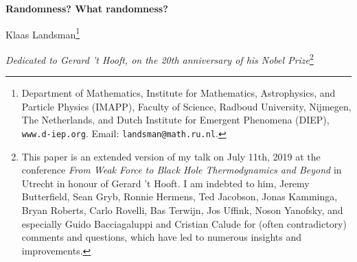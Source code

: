\documentclass[11pt,a4paper]{article}
\numberwithin{equation}{section}
\begin{document}
 
 \setlength{\unitlength}{1cm}\cleardoublepage
\date\nodate
\begin{center}
\begin{huge}
{\bf Randomness? What randomness?}
\end{huge}
\bigskip

\bigskip

\renewcommand{\thefootnote}{\alph{footnote}}
\begin{Large}
 Klaas Landsman\footnote{Department of Mathematics, 
Institute for Mathematics, Astrophysics, and Particle Physics (IMAPP), Faculty of Science, Radboud University, Nijmegen, The Netherlands, and Dutch Institute for Emergent Phenomena (DIEP), \texttt{www.d-iep.org}.
Email:
\texttt{landsman@math.ru.nl}.}
\end{Large}
\bigskip


\begin{large}
\emph{Dedicated to Gerard 't Hooft, on the 20th anniversary of his Nobel Prize}\footnote{This paper is an extended version of my talk on July 11th, 2019 at the conference \emph{From Weak Force to Black Hole Thermodynamics and Beyond} in Utrecht in honour of Gerard 't Hooft. I am indebted to him,  Jeremy Butterfield,  Sean Gryb, Ronnie Hermens, Ted Jacobson, Jonas Kamminga, Bryan Roberts, Carlo Rovelli, Bas Terwijn,  Jos Uffink,  Noson Yanofsky, and especially Guido Bacciagaluppi and Cristian Calude for (often contradictory) comments and questions, which have led to numerous  insights and improvements.  }
\end{large}
\end{center}
\bigskip

 \begin{abstract} 
\noindent 
This is a review of the issue of randomness in quantum mechanics, with special emphasis on its ambiguity; for example, randomness has different antipodal relationships to  determinism, computability, and compressibility. Following a (Wittgensteinian) philosophical discussion of randomness in general, I 
 argue that deterministic interpretations of quantum mechanics (like Bohmian mechanics or 't Hooft's Cellular Automaton interpretation) are strictly speaking incompatible with the Born rule.  
I also stress the role of outliers, i.e.\ measurement outcomes that are \emph{not} 1-random. Although these occur with low (or even zero) probability, their very existence implies  that the no-signaling principle used in proofs of randomness of outcomes of quantum-mechanical measurements (and of the safety of quantum cryptography) should be reinterpreted statistically, like the second law of thermodynamics. In three appendices I 
discuss the Born rule and its status in both single and repeated experiments,  review the notion of 1-randomness (or algorithmic randomness) that in various guises was investigated by Solomonoff, Kolmogorov, Chaitin, Martin-L\"{o}f, Schnorr, and others, and treat Bell's (1964) Theorem and the Free Will Theorem with their implications for randomness.  
\end{abstract}
\bigskip
\tableofcontents
\end{document}
